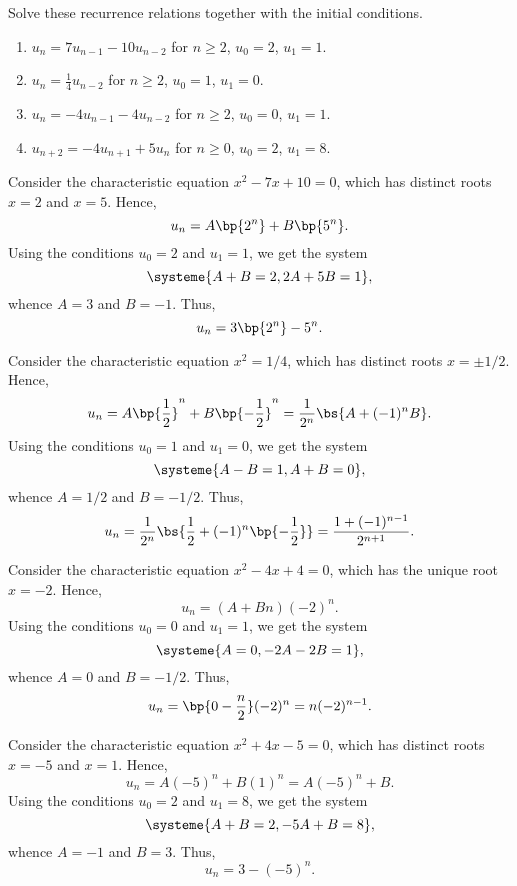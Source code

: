\begin{problem}
    Solve these recurrence relations together with the initial conditions.

    \begin{enumerate}
        \item $u_n = 7u_{n-1} - 10u_{n-2}$ for $n \geq 2$, $u_0 = 2$, $u_1 = 1$.
        \item $u_n = \frac14 u_{n-2}$ for $n \geq 2$, $u_0 = 1$, $u_1 = 0$.
        \item $u_n = -4u_{n-1} - 4u_{n-2}$ for $n \geq 2$, $u_0 = 0$, $u_1 = 1$.
        \item $u_{n+2} = -4u_{n+1} + 5u_n$ for $n \geq 0$, $u_0 = 2$, $u_1 = 8$.
    \end{enumerate}
\end{problem}
\clearpage
\begin{solution}
    \begin{ppart}
        Consider the characteristic equation $x^2 - 7x + 10 = 0$, which has distinct roots $x = 2$ and $x = 5$. Hence, \[u_n = A\bp{2^n} + B\bp{5^n}.\] Using the conditions $u_0 = 2$ and $u_1 = 1$, we get the system \[\systeme{A + B = 2, 2A + 5B = 1},\] whence $A = 3$ and $B = -1$. Thus, \[u_n = 3\bp{2^n} - 5^n.\]
    \end{ppart}
    \begin{ppart}
        Consider the characteristic equation $x^2 = 1/4$, which has distinct roots $x = \pm 1/2$. Hence, \[u_n = A\bp{\frac12}^n + B\bp{-\frac12}^n = \frac1{2^n} \bs{A + (-1)^n B}.\] Using the conditions $u_0 = 1$ and $u_1 = 0$, we get the system \[\systeme{A - B = 1,A + B = 0},\] whence $A = 1/2$ and $B = -1/2$. Thus, \[u_n = \frac1{2^n} \bs{\frac12 + (-1)^n \bp{-\frac12}} = \frac{1 + (-1)^{n-1}}{2^{n+1}}.\]
    \end{ppart}
    \begin{ppart}
        Consider the characteristic equation $x^2 - 4x + 4 =0 $, which has the unique root $x = -2$. Hence, \[u_n = (A + Bn) (-2)^n.\] Using the conditions $u_0 = 0$ and $u_1 = 1$, we get the system \[\systeme{A = 0, -2 A - 2B = 1},\] whence $A = 0$ and $B = -1/2$. Thus, \[u_n = \bp{0-\frac{n}2} (-2)^n = n (-2)^{n-1}.\]
    \end{ppart}
    \begin{ppart}
        Consider the characteristic equation $x^2 + 4x - 5 = 0$, which has distinct roots $x = -5$ and $x = 1$. Hence, \[u_n = A (-5)^n + B(1)^n = A(-5)^n + B.\] Using the conditions $u_0 = 2$ and $u_1 = 8$, we get the system \[\systeme{A + B = 2, -5A + B = 8},\] whence $A = -1$ and $B = 3$. Thus, \[u_n = 3 - (-5)^n.\]
    \end{ppart}
\end{solution}

